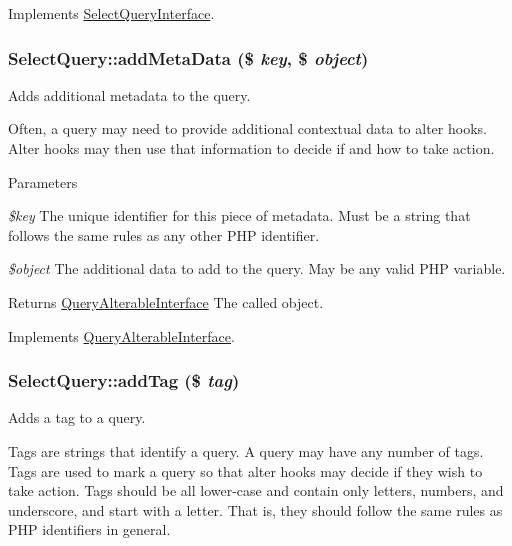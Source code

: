 Implements \hyperlink{interfaceSelectQueryInterface_a974ba99af27e9b77d7f5fc69ec81bd45}{SelectQueryInterface}.\hypertarget{classSelectQuery_a6e453f491388dfd67e568baa8b807b01}{
\subsubsection[{addMetaData}]{\setlength{\rightskip}{0pt plus 5cm}SelectQuery::addMetaData (\$ {\em key}, \/  \$ {\em object})}}
\label{classSelectQuery_a6e453f491388dfd67e568baa8b807b01}
Adds additional metadata to the query.

Often, a query may need to provide additional contextual data to alter hooks. Alter hooks may then use that information to decide if and how to take action.


\begin{DoxyParams}{Parameters}
\item[{\em \$key}]The unique identifier for this piece of metadata. Must be a string that follows the same rules as any other PHP identifier. \item[{\em \$object}]The additional data to add to the query. May be any valid PHP variable.\end{DoxyParams}
\begin{DoxyReturn}{Returns}
\hyperlink{interfaceQueryAlterableInterface}{QueryAlterableInterface} The called object. 
\end{DoxyReturn}


Implements \hyperlink{interfaceQueryAlterableInterface_a4551fab9d5d25eeed040fdac7c8be4ae}{QueryAlterableInterface}.\hypertarget{classSelectQuery_a2efa69685cefbe98f824f5c5e97e092f}{
\subsubsection[{addTag}]{\setlength{\rightskip}{0pt plus 5cm}SelectQuery::addTag (\$ {\em tag})}}
\label{classSelectQuery_a2efa69685cefbe98f824f5c5e97e092f}
Adds a tag to a query.

Tags are strings that identify a query. A query may have any number of tags. Tags are used to mark a query so that alter hooks may decide if they wish to take action. Tags should be all lower-\/case and contain only letters, numbers, and underscore, and start with a letter. That is, they should follow the same rules as PHP identifiers in general.


